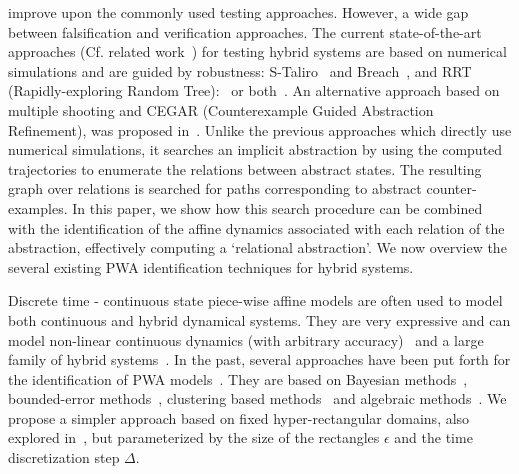 
improve upon the commonly used testing approaches. However, a wide gap
between falsification and verification approaches. The current
state-of-the-art approaches (Cf. related work~\cite{nghiem2010monte})
for testing hybrid systems are based on numerical simulations and are
guided by robustness: S-Taliro~\cite{annpureddy2011s} and
Breach~\cite{donze2010breach}, and RRT (Rapidly-exploring Random
Tree):~\cite{nahhal_test_2007,Dang09} or
both~\cite{dreossi2015efficient}. An alternative approach based on
multiple shooting and CEGAR (Counterexample Guided Abstraction
Refinement), was proposed in~\cite{zutshi2014multiple}. Unlike the
previous approaches which directly use numerical simulations, it
searches an implicit abstraction by using the computed trajectories to
enumerate the relations between abstract states. The resulting graph
over relations is searched for paths corresponding to abstract
counter-examples. In this paper, we show how this search procedure can
be combined with the identification of the affine dynamics associated
with each relation of the abstraction, effectively computing a
`relational abstraction'. We now overview the several existing PWA
identification techniques for hybrid systems.


 Discrete time - continuous
state piece-wise affine models are often used to model both continuous
and hybrid dynamical systems. They are very expressive and can model
non-linear continuous dynamics (with arbitrary
accuracy)~\cite{wen2008basis} and a large family of hybrid
systems~\cite{heemels2001equivalence}. In the past, several approaches
have been put forth for the identification of PWA
models~\cite{paoletti2007identification}.  They are based on Bayesian
methods~\cite{juloski2005bayesian}, bounded-error
methods~\cite{bemporad2003greedy, bemporad2005bounded,
roll2004identification, alur2014precise}, clustering based
methods~\cite{ferrari2003clustering} and algebraic
methods~\cite{vidal2003algebraic}. We propose a simpler approach based
on fixed hyper-rectangular domains, also explored
in~\cite{billings1987piecewise}, but parameterized by the size of the
rectangles $\epsilon$ and the time discretization step $\Delta$.

